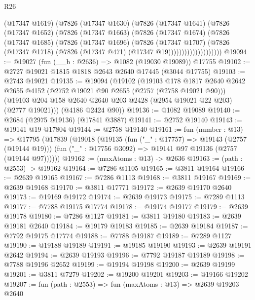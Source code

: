 \begin{lexlean}{R26}
\begin{coremodule}
                      (@17347 @1619)
                      (@7826
                        (@17347 @1630)
                        (@7826
                          (@17347 @1641)
                          (@7826
                            (@17347 @1652)
                            (@7826
                              (@17347 @1663)
                              (@7826
                                (@17347 @1674)
                                (@7826
                                  (@17347 @1685)
                                  (@7826
                                    (@17347 @1696)
                                    (@7826
                                      (@17347 @1707)
                                      (@7826
                                        (@17347 @1718)
                                        (@7826 (@17347 @471) (@17347 @19))))))))))))))))))))
@19094 := @19027 (fun (__b : @2636) => @1082 (@19030 @19089)) @17755
@19102 := @2727 @19021 @1815 @1818 @2643 @2640 @17445 (@3044 @17755)
@19103 := @2743 @19021
@19135 := @19094
    (@19102
      (@19103
        @178
        @1817
        @2640
        @2642
        @2655
        @4152
        (@2752 @19021 @90 @2655 (@2757 (@2758 @19021 @90)))
        (@19103 @204 @158 @2640 @2640 @203 @2428 (@2954 @19021 @22 @203) (@2777 @19021)))
      (@4186 @2424 @90))
@19136 := @1082 @19089
@19140 := @2684 (@2975 @19136) (@17841 @3887)
@19141 := @2752 @19140
@19143 := @19141 @19 @17804
@19144 := @2758 @19140
@19161 := fun (number : @13) =>
  @17795
    (@17839
      (@19018
        (@19135
          (fun ("_" : @17757) => @19143 (@2757 (@19144 @19)))
          (fun ("_" : @17756 @3092) => @19141 @97 @19136 (@2757 (@19144 @97))))))
@19162 := (maxAtoms : @13) -> @2636
@19163 := (path : @2553) -> @19162
@19164 := @7286 @1105
@19165 := @3811 @19164
@19166 := @2639 @19165
@19167 := @7286 @1113
@19168 := @3811 @19167
@19169 := @2639 @19168
@19170 := @3811 @17771
@19172 := @2639 @19170 @2640
@19173 := @19169 @19172
@19174 := @2639 @19173
@19175 := @7289 @1113
@19177 := @7788 @19175 @17774
@19178 := @19174 @19177
@19179 := @2639 @19178
@19180 := @7286 @1127
@19181 := @3811 @19180
@19183 := @2639 @19181 @2640
@19184 := @19179 @19183
@19185 := @2639 @19184
@19187 := @7792 @19175 @17774
@19188 := @7788 @19187
@19189 := @7289 @1127
@19190 := @19188 @19189
@19191 := @19185 @19190
@19193 := @2639 @19191 @2642
@19194 := @2639 @19193
@19196 := @7792 @19187 @19189
@19198 := @7788 @19196 @2652
@19199 := @19194 @19198
@19200 := @2639 @19199
@19201 := @3811 @7279
@19202 := @19200 @19201
@19203 := @19166 @19202
@19207 := fun (path : @2553) => fun (maxAtoms : @13) => @2639 @19203 @2640

\end{coremodule}
\end{lexlean}
